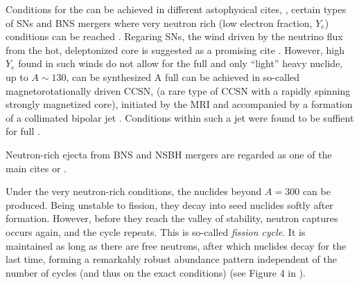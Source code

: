 Conditions for the \rproc{} can be achieved in different astophysical cites, \eg, 
certain types of \acp{SN} and \ac{BNS} mergers where very neutron rich (low 
electron fraction, $Y_e$) conditions can be reached
\citep{Mathews:1990,Thielemann:2011,Lippuner:2015gwa,Siegel:2019mlp}. 
Regaring \acp{SN}, the wind driven by the neutrino flux from the hot, deleptonized
core \citep{Qian:1996xt} is suggested as a promising cite \citep{Woosley:2002,Wanajo:2006mq}.
However, high $Y_e$ found in such winds do not allow for the full \rproc{} and only ``light'' heavy 
nuclide, up to $A\sim130$, can be synthesized 
\citep{Qian:1996xt,Thompson:2001ys,Fischer:2010,Roberts:2010,MartinezPinedo:2012rb,Wanajo:2013} 
%
A full \rproc{} can be achieved in so-called magnetorotationally driven \ac{CCSN},
(a rare type of \ac{CCSN} with a rapidly spinning strongly magnetized core), 
initiated by the \ac{MRI} and accompanied by a %
formation of a 
collimated bipolar jet 
\citep{Wheeler:2000,Akiyama:2003,Burrows:2007yx,Mosta:2014jaa,Mosta:2015,Siegel:2019mlp}.
Conditions within such a jet were found to be suffient for full \rproc{} \nuc{} 
\citep{Winteler:2012,Nishimura:2015nca}.

Neutron-rich ejecta from \ac{BNS} and \ac{NSBH} mergers are regarded as one of 
the main cites or \rproc{} \nuc{}.
%

Under the very neutron-rich conditions, 
the nuclides beyond $A=300$ can be produced. Being unstable to fission, they 
decay into seed nuclides softly after formation.
However, before they reach the valley of stability, neutron captures occurs again, and the cycle repeats.
This is so-called \textit{fission cycle}.
It is maintained as long as there are free neutrons, after which nuclides decay 
for the last time, forming a remarkably robust abundance pattern independent of the 
number of cycles (and thus on the exact conditions) 
(see Figure 4 in \citet{Korobkin:2012uy}).

